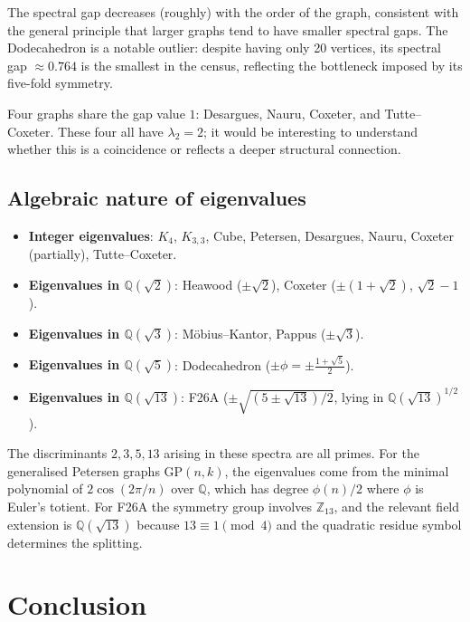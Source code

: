\documentclass[11pt,a4paper]{article}
\begin{document}
The spectral gap decreases (roughly) with the order of the graph, consistent with the general principle that larger graphs tend to have smaller spectral gaps. The Dodecahedron is a notable outlier: despite having only 20 vertices, its spectral gap $\approx 0.764$ is the smallest in the census, reflecting the bottleneck imposed by its five-fold symmetry.

Four graphs share the gap value $1$: Desargues, Nauru, Coxeter, and Tutte--Coxeter. These four all have $\lambda_2 = 2$; it would be interesting to understand whether this is a coincidence or reflects a deeper structural connection.

\subsection{Algebraic nature of eigenvalues}

\begin{itemize}
\item \textbf{Integer eigenvalues}: $K_4$, $K_{3,3}$, Cube, Petersen, Desargues, Nauru, Coxeter (partially), Tutte--Coxeter.
\item \textbf{Eigenvalues in $\mathbb{Q}(\sqrt{2})$}: Heawood ($\pm\sqrt{2}$), Coxeter ($\pm(1+\sqrt{2})$, $\sqrt{2}-1$).
\item \textbf{Eigenvalues in $\mathbb{Q}(\sqrt{3})$}: M\"{o}bius--Kantor, Pappus ($\pm\sqrt{3}$).
\item \textbf{Eigenvalues in $\mathbb{Q}(\sqrt{5})$}: Dodecahedron ($\pm\phi = \pm\tfrac{1+\sqrt{5}}{2}$).
\item \textbf{Eigenvalues in $\mathbb{Q}(\sqrt{13})$}: F26A ($\pm\sqrt{(5\pm\sqrt{13})/2}$, lying in $\mathbb{Q}(\sqrt{13})^{1/2}$).
\end{itemize}

The discriminants $2, 3, 5, 13$ arising in these spectra are all primes. For the generalised Petersen graphs $\mathrm{GP}(n,k)$, the eigenvalues come from the minimal polynomial of $2\cos(2\pi/n)$ over $\mathbb{Q}$, which has degree $\phi(n)/2$ where $\phi$ is Euler's totient. For F26A the symmetry group involves $\mathbb{Z}_{13}$, and the relevant field extension is $\mathbb{Q}(\sqrt{13})$ because $13 \equiv 1 \pmod{4}$ and the quadratic residue symbol determines the splitting.

\section{Conclusion}
\end{document}
